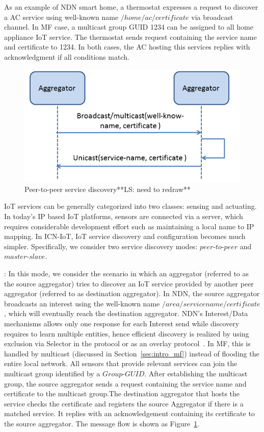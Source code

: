 As an example of NDN smart home, a thermostat expresses a request to
discover a AC service using well-known name $/home/ac/certificate$ via
broadcast channel.  In MF case, a multicast group GUID 1234 can be
assigned to all home appliance IoT service.  The thermostat sends
request containing the service name and certificate to 1234.  In both
cases, the AC hosting this services replies with acknowledgment if
all conditions match.
\begin{figure}
\includegraphics[width=\columnwidth]{figure/service_discovery.png}
\caption{\label{fig:ser_dis}Peer-to-peer service discovery**LS: need to redraw**}
\end{figure}
\iffalse
IoT services can be generally categorized into two classes: sensing and actuating. In today's IP based IoT platforms, sensors are connected via a server, which requires considerable development effort such as maintaining a local name to IP mapping. In ICN-IoT, IoT service discovery and configuration becomes much simpler. Specifically, we consider two service discovery modes: $peer$-$to$-$peer$ and $master$-$slave$.


\vspace{1mm}: In this mode, we consider the scenario in which an aggregator (referred to as the source aggregator) tries to discover an IoT service provided by another peer aggregator (referred to as destination aggregator). In NDN, the source aggregator broadcasts an interest using the well-known name $/area/servicename/certificate$, which will eventually reach the destination aggregator. NDN's Interest/Data mechanisms allows only one response for each Interest send while discovery requires to learn multiple entities, hence efficient discovery is realized by using exclusion via Selector in the protocol or as an overlay protocol~\cite{ravindran2013information}. In MF, this is handled by multicast (discussed in Section~\ref{sec:intro_mf}) instead of flooding the entire local network. All sensors that provide relevant services can join the multicast group identified by a $Group$-$GUID$. After establishing the multicast group, the source aggregator sends a request containing the service name and certificate to the multicast group.The destination aggregator that hosts the service checks the certificate and registers the source Aggregator if there is a matched service. It replies with an acknowledgement containing its certificate to the source aggregator. The message flow is shown as Figure~\ref{fig:ser_dis}.

